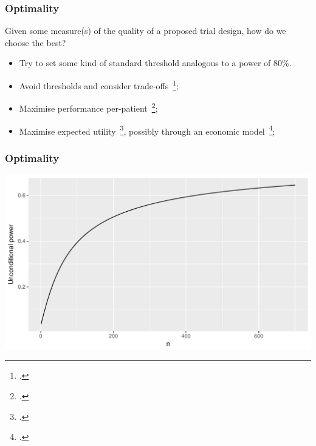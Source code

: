 \documentclass{beamer}
\begin{document}

\begin{frame}
\frametitle{Optimality}
Given some measure(s) of the quality of a proposed trial design, how do we choose the best?
\begin{itemize}
\item Try to set some kind of standard threshold analogous to a power of 80\%.
\item Avoid thresholds and consider trade-offs~\footcite{Bacchetti2008};
\item Maximise performance per-patient~\footcite{Stallard2012};
\item Maximise expected utility~\footcite{Lindley1997}, possibly through an economic model~\footcite{Patel2013};
\end{itemize}
\end{frame}

\begin{frame}
\frametitle{Optimality}
\centering
\includegraphics[scale=0.6]{stallard}
\end{frame}

\end{document}
